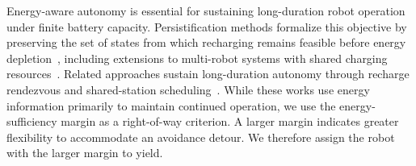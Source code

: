 Energy-aware autonomy is essential for sustaining long-duration robot operation under finite battery capacity.
Persistification methods formalize this objective by preserving the set of states from which recharging remains feasible before energy depletion~\cite{notomista2018persistification, notomista2020persistification}, including extensions to multi-robot systems with shared charging resources~\cite{fouad2022energy}.
Related approaches sustain long-duration autonomy through recharge rendezvous and shared-station scheduling~\cite{mathew2015multirobot, kumar2025persistent}.
While these works use energy information primarily to maintain continued operation, we use the energy-sufficiency margin as a right-of-way criterion.
A larger margin indicates greater flexibility to accommodate an avoidance detour.
We therefore assign the robot with the larger margin to yield.